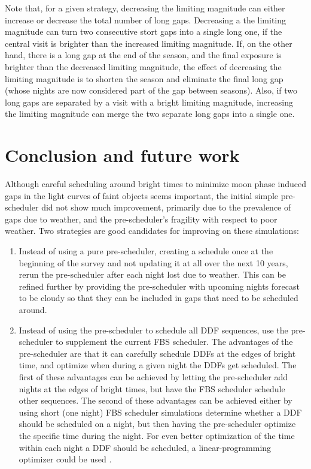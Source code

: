 \documentclass[DM,authoryear,toc]{lsstdoc}
\begin{document}
Note that, for a given strategy, decreasing the limiting magnitude can either increase or decrease the total number of long gaps. Decreasing a the limiting magnitude can turn two consecutive stort gaps into a single long one, if the central visit is brighter than the increased limiting magnitude. If, on the other hand, there is a long gap at the end of the season, and the final exposure is brighter than the decreased limiting magnitude, the effect of decreasing the limiting magnitude is to shorten the season and eliminate the final long gap (whose nights are now considered part of the gap between seasons). Also, if two long gaps are separated by a visit with a bright limiting magnitude, increasing the limiting magnitude can merge the two separate long gaps into a single one.

\section{Conclusion and future work}

Although careful scheduling around bright times to minimize moon phase induced gaps in the light curves of faint objects seems important, the initial simple pre-scheduler did not show much improvement, primarily due to the prevalence of gaps due to weather, and the pre-scheduler's fragility with respect to poor weather.
Two strategies are good candidates for improving on these simulations:
\begin{enumerate}
  \item Instead of using a pure pre-scheduler, creating a schedule once at the beginning of the survey and not updating it at all over the next 10 years, rerun the pre-scheduler after each night lost due to weather. This can be refined further by providing the pre-scheduler with upcoming nights forecast to be cloudy so that they can be included in gaps that need to be scheduled around.
  \item Instead of using the pre-scheduler to schedule all DDF sequences, use the pre-scheduler to supplement the current FBS scheduler.
    The advantages of the pre-scheduler are that it can carefully schedule DDFs at the edges of bright time, and optimize when during a given night the DDFs get scheduled.
    The first of these advantages can be achieved by letting the pre-scheduler add nights at the edges of bright times, but have the FBS scheduler schedule other sequences.
    The second of these advantages can be achieved either by using short (one night) FBS scheduler simulations determine whether a DDF should be scheduled on a night, but then having the pre-scheduler optimize the specific time during the night.
    For even better optimization of the time within each night a DDF should be scheduled, a linear-programming optimizer could be used \citep{bellm_zwicky_2019}.
\end{enumerate}
\end{document}

